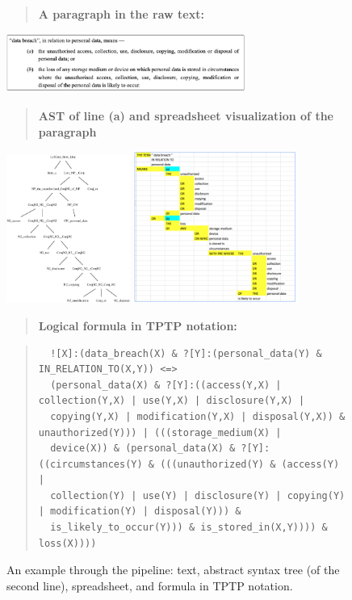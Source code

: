 \documentclass{IOS-Book-Article}
\newcommand{\bequ}{\begin{quote}}
\newcommand{\enqu}{\end{quote}}
\begin{document}
\begin{figure}
    \bequ
    \textbf{A paragraph in the raw text:}
    \enqu
    \includegraphics[width=0.7\textwidth]{text.png}

    \bequ
    \textbf{AST of line (a) and spreadsheet visualization of the paragraph}
    \enqu
    \includegraphics[width=0.36\textwidth]{tree.eps} \includegraphics[width=0.48\textwidth]{assembly.png}
      \bequ
      \textbf{Logical formula in TPTP notation:}
      \enqu
    \bequ
    \tiny
    \begin{verbatim}
  ![X]:(data_breach(X) & ?[Y]:(personal_data(Y) & IN_RELATION_TO(X,Y)) <=>
  (personal_data(X) & ?[Y]:((access(Y,X) | collection(Y,X) | use(Y,X) | disclosure(Y,X) | 
  copying(Y,X) | modification(Y,X) | disposal(Y,X)) & unauthorized(Y))) | (((storage_medium(X) |   
  device(X)) & (personal_data(X) & ?[Y]:((circumstances(Y) & (((unauthorized(Y) & (access(Y) |
  collection(Y) | use(Y) | disclosure(Y) | copying(Y) | modification(Y) | disposal(Y))) &
  is_likely_to_occur(Y))) & is_stored_in(X,Y)))) & loss(X))))
    \end{verbatim}
    \enqu
\caption{An example through the pipeline: text, abstract syntax tree (of the second line), spreadsheet, and formula in TPTP notation.}
\label{pipeline-ex}
\end{figure}
\end{document}
